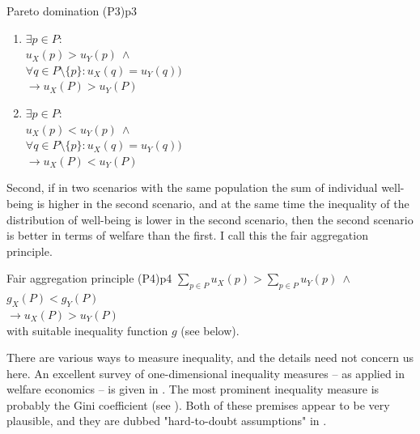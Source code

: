 \begin{Premise}{Pareto domination (P3)}{p3}
  \begin{enumerate}
  \item
    $
      \exists p \in P:
    $ \\
    \hspace*{1cm} $
      u_X(p) > u_Y(p) \ \wedge
    $ \\
    \hspace*{1cm} $
      \forall q \in P \setminus \{p\}: u_X(q) = u_Y(q) )
    $ \\
    \hspace*{.5cm} $
      \rightarrow
      u_X(P) > u_Y(P) 
    $
  \item
    $
      \exists p \in P:
    $ \\
    \hspace*{1cm} $
      u_X(p) < u_Y(p) \ \wedge
    $ \\
    \hspace*{1cm} $
      \forall q \in P \setminus \{p\}: u_X(q) = u_Y(q) )
    $ \\
    \hspace*{.5cm} $
      \rightarrow
      u_X(P) < u_Y(P) 
    $
  \end{enumerate}
\end{Premise}

Second, if in two scenarios with the same population the sum of individual well-being is higher in the second scenario, and at the same time the inequality of the distribution of well-being is lower in the second scenario, then the second scenario is better in terms of welfare than the first. I call this the fair aggregation principle. 

\begin{Premise}{Fair aggregation principle (P4)}{p4}
  \hspace*{.5cm} $
    \sum_{p\in P} u_X(p) > \sum_{p\in P} u_Y(p) \ \wedge
  $ \\
  \hspace*{.5cm} $g_X(P) < g_Y(P)
  $ \\
  $
    \rightarrow u_X(P) > u_Y(P)
  $ \\
  with suitable inequality function $g$ (see below).
\end{Premise}

There are various ways to measure inequality, and the details need not concern us here. An excellent survey of one-dimensional inequality measures – as applied in welfare economics – is given in . The most prominent inequality measure is probably the Gini coefficient (see ). Both of these premises appear to be very plausible, and they are dubbed "hard-to-doubt assumptions" in . 

